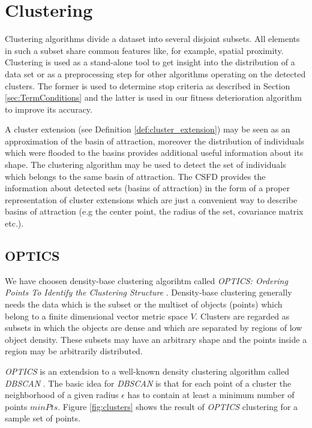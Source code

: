 
\chapter{Clustering}
\label{ch:Clustering}

Clustering algorithms divide a dataset into several disjoint subsets. All elements in such
a subset share common features like, for example, spatial proximity.
Clustering is used as a stand-alone tool to get insight into the distribution
of a data set or as a preprocessing step for other algorithms operating on the
detected clusters. The former is used to determine stop criteria as described
in Section \ref{sec:TermConditions} and the latter is used in our fitness deterioration
algorithm to improve its accuracy.

A cluster extension (see Definition \ref{def:cluster_extension}) 
may be seen as an approximation of the basin of attraction,
moreover the distribution of individuals which were flooded to the basins provides 
additional useful information about its shape. 
The clustering algorithm may be used to detect the set of individuals which
belongs to the same basin of attraction. 
The CSFD provides the information about detected
sets (basins of attraction) in the form of a proper representation of 
cluster extensions which are just a convenient way to describe basins of attraction 
(e.g the center point, the radius of the set, covariance matrix etc.). 

\section{OPTICS}
\label{sec:OPTICS}

We have choosen density-base clustering algorihtm called \textit{OPTICS:
Ordering Points To Identify the Clustering Structure} \cite{optics}. 
Density-base clustering generally needs the data which is the subset
or the multiset of objects (points) which belong to a finite dimensional
vector metric space $V$.
Clusters are regarded as subsets in which the objects are 
dense and which are separated by regions of low object density.
These subsets may have an arbitrary shape and the points inside a region
may be arbitrarily distributed.

\textit{OPTICS} is an extendsion to a well-known density clustering algorithm
called \textit{DBSCAN} \cite{dbscan}. The basic idea for \textit{DBSCAN} is that
for each point of a cluster the neighborhood of a given radius $\epsilon$ has to contain
at least a minimum number of points $minPts$. Figure
\ref{fig:clusters} shows the result of \textit{OPTICS} clustering for a sample set of points.

